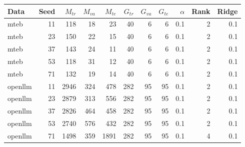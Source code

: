 \begin{tabular}{lrrrrrrrrrr}
\toprule
Data & Seed & $M_{tr}$ & $M_{va}$ & $M_{te}$ & $G_{tr}$ & $G_{va}$ & $G_{te}$ & $\alpha$ & Rank & Ridge \\
\midrule
mteb & 11 & 118 & 18 & 23 & 40 & 6 & 6 & 0.1 & 2 & 0.1 \\
mteb & 23 & 150 & 22 & 15 & 40 & 6 & 6 & 0.1 & 2 & 0.1 \\
mteb & 37 & 143 & 24 & 11 & 40 & 6 & 6 & 0.1 & 2 & 0.1 \\
mteb & 53 & 118 & 31 & 12 & 40 & 6 & 6 & 0.1 & 2 & 0.1 \\
mteb & 71 & 132 & 19 & 14 & 40 & 6 & 6 & 0.1 & 2 & 0.1 \\
openllm & 11 & 2946 & 324 & 478 & 282 & 95 & 95 & 0.1 & 2 & 0.1 \\
openllm & 23 & 2879 & 313 & 556 & 282 & 95 & 95 & 0.1 & 2 & 0.1 \\
openllm & 37 & 2826 & 464 & 458 & 282 & 95 & 95 & 0.1 & 2 & 0.1 \\
openllm & 53 & 2740 & 576 & 432 & 282 & 95 & 95 & 0.1 & 2 & 0.1 \\
openllm & 71 & 1498 & 359 & 1891 & 282 & 95 & 95 & 0.1 & 4 & 0.1 \\
\bottomrule
\end{tabular}
